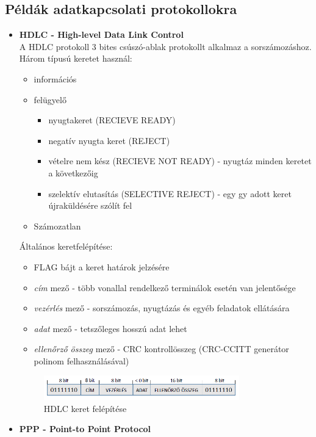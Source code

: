 \documentclass[12pt]{article}
\begin{document}
    \subsection*{Példák adatkapcsolati protokollokra}

    \begin{itemize}[leftmargin=7.5mm]
        \renewcommand{\labelitemi}{$\vcenter{\hbox{\tiny$\bullet$}}$}
    	\item \textbf{\small HDLC - High-level Data Link Control} \\
        A HDLC protokoll 3 bites csúszó-ablak protokollt alkalmaz  a sorszámozáshoz.\\
        Három típusú keretet használ:
        \begin{itemize}[leftmargin=7.5mm]
            \renewcommand{\labelitemii}{$\vcenter{\hbox{\tiny$\circ$}}$}
        	\item információs
        	\item felügyelő
        	\begin{itemize}[leftmargin=7.5mm]
            \renewcommand{\labelitemiii}{$\vcenter{\hbox{\tiny$\diamond$}}$}
                \item nyugtakeret (RECIEVE READY)
                \item negatív nyugta keret (REJECT)
                \item vételre nem kész (RECIEVE NOT READY) - nyugtáz minden keretet a következőig
                \item szelektív elutasítás (SELECTIVE REJECT) - egy gy adott keret újraküldésére szólít fel
        	\end{itemize}
        	\item Számozatlan
        \end{itemize}

    Általános keretfelépítése:
    \begin{itemize}[leftmargin=7.5mm]
        \renewcommand{\labelitemii}{$\vcenter{\hbox{\tiny$\circ$}}$}
      	\item FLAG bájt a keret határok jelzésére
       	\item \textit{cím} mező - több vonallal rendelkező terminálok esetén van jelentősége
       	\item \textit{vezérlés} mező - sorszámozás, nyugtázás és egyéb feladatok ellátására
       	\item \textit{adat} mező - tetszőleges hosszú adat lehet
       	\item \textit{ellenőrző összeg} mező - CRC kontrollösszeg  (CRC-CCITT generátor polinom felhasználásával)
    \end{itemize}
    \begin{figure}[H]
       	\centering
       	\includegraphics[width=0.8\textwidth]{img/hdlc_keret.png}
       	\caption{HDLC keret felépítése}	
    \end{figure}
\newpage
    \item \textbf{\small PPP - Point-to Point Protocol} \\


\end{itemize}
\end{document}
